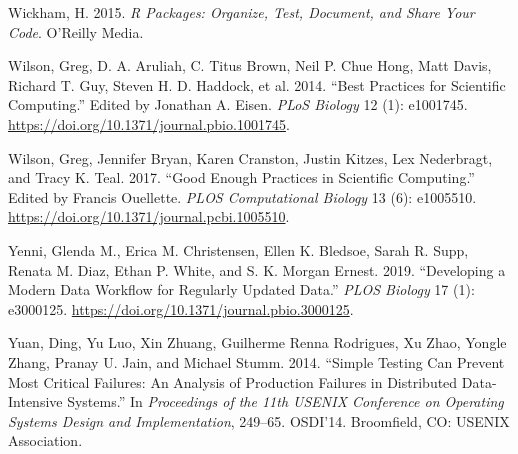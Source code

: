 \documentclass[
]{article}
\newlength{\cslhangindent}
\newenvironment{cslreferences}%
  {\setlength{\parindent}{0pt}%
  \everypar{\setlength{\hangindent}{\cslhangindent}}\ignorespaces}%
  {\par}
\begin{document}
\begin{cslreferences}
\leavevmode\hypertarget{ref-wickham_r_2015}{}%
Wickham, H. 2015. \emph{R Packages: Organize, Test, Document, and Share
Your Code}. O'Reilly Media.

\leavevmode\hypertarget{ref-wilson_best_2014}{}%
Wilson, Greg, D. A. Aruliah, C. Titus Brown, Neil P. Chue Hong, Matt
Davis, Richard T. Guy, Steven H. D. Haddock, et al. 2014. ``Best
Practices for Scientific Computing.'' Edited by Jonathan A. Eisen.
\emph{PLoS Biology} 12 (1): e1001745.
\url{https://doi.org/10.1371/journal.pbio.1001745}.

\leavevmode\hypertarget{ref-wilson_good_2017}{}%
Wilson, Greg, Jennifer Bryan, Karen Cranston, Justin Kitzes, Lex
Nederbragt, and Tracy K. Teal. 2017. ``Good Enough Practices in
Scientific Computing.'' Edited by Francis Ouellette. \emph{PLOS
Computational Biology} 13 (6): e1005510.
\url{https://doi.org/10.1371/journal.pcbi.1005510}.

\leavevmode\hypertarget{ref-yenni_developingmoderndata_2019}{}%
Yenni, Glenda M., Erica M. Christensen, Ellen K. Bledsoe, Sarah R. Supp,
Renata M. Diaz, Ethan P. White, and S. K. Morgan Ernest. 2019.
``Developing a Modern Data Workflow for Regularly Updated Data.''
\emph{PLOS Biology} 17 (1): e3000125.
\url{https://doi.org/10.1371/journal.pbio.3000125}.

\leavevmode\hypertarget{ref-yuan_simpletestingcan_2014}{}%
Yuan, Ding, Yu Luo, Xin Zhuang, Guilherme Renna Rodrigues, Xu Zhao,
Yongle Zhang, Pranay U. Jain, and Michael Stumm. 2014. ``Simple Testing
Can Prevent Most Critical Failures: An Analysis of Production Failures
in Distributed Data-Intensive Systems.'' In \emph{Proceedings of the
11th USENIX Conference on Operating Systems Design and Implementation},
249--65. OSDI'14. Broomfield, CO: USENIX Association.
\end{cslreferences}
\end{document}
